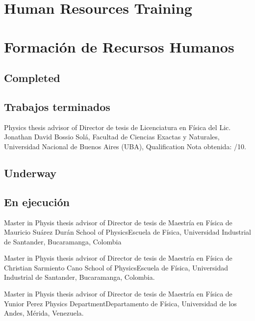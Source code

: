 \ifeng
\section*{Human Resources Training}
\else
\section*{Formación de Recursos Humanos}
\fi


\ifeng
\subsection*{Completed}
\else
\subsection*{Trabajos terminados}
\fi

\ifeng
Physics thesis advisor of
\else
Director de tesis de Licenciatura en Física del
\fi
Lic. Jonathan David Bossio Solá, \at Facultad de Ciencias Exactas y Naturales, Universidad Nacional de Buenos Aires (UBA), \ifeng Qualification \else Nota obtenida: /10.

\ifeng
\subsection*{Underway}
\else
\subsection*{En ejecución}
\fi

\ifeng
Master in Physis thesis advisor of
\else
Director de tesis de Maestría en Física de
\fi
Mauricio Suárez Durán \at \ifeng School of Physics\else Escuela de Física\fi, Universidad Industrial de Santander, Bucaramanga, Colombia

\ifeng
Master in Physis thesis advisor of
\else
Director de tesis de Maestría en Física de
\fi
Christian Sarmiento Cano \at \ifeng School of Physics\else Escuela de Física\fi, Universidad Industrial de Santander, Bucaramanga, Colombia.

\ifeng
Master in Physis thesis advisor of
\else
Director de tesis de Maestría en Física de
\fi
Yunior Perez \at \ifeng Physics Department\else Departamento de Física\fi, Universidad de los Andes, Mérida, Venezuela. 


